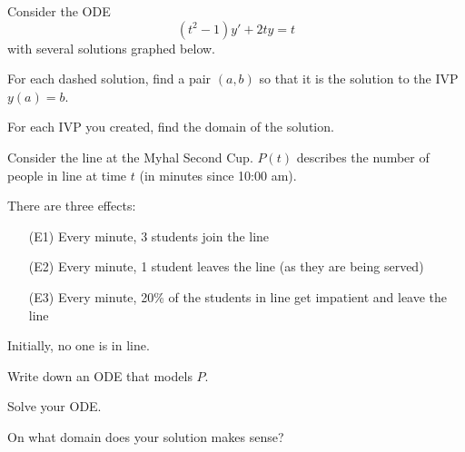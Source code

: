 \documentclass{workbook}
\begin{document}
\begin{slide}
	\question
	Consider the ODE
	\[
		(t^2-1)y'+2ty=t
	\]
	with several solutions graphed below.


	\begin{parts}
		\item For each dashed solution, find a pair $(a,b)$ so that
		it is the solution to the IVP $y(a)=b$.
		\item For each IVP you created, find the domain of the solution.
	\end{parts}
\end{slide}

\begin{slide}
	\question
Consider the line at the Myhal Second Cup. $P(t)$ describes the number of people in line at time $t$ (in minutes since 10:00 am).

There are three effects:
\begin{itemize}
	\item[(E1)] Every minute, 3 students join the line
	\item[(E2)] Every minute, 1 student leaves the line (as they are being served)
	\item[(E3)] Every minute, 20\% of the students in line get impatient and leave the line
\end{itemize}

Initially, no one is in line.

	\begin{parts}
		\item Write down an ODE that models $P$.
		\item Solve your ODE.
		\item On what domain does your solution makes sense?
	\end{parts}
\end{slide}
\end{document}
